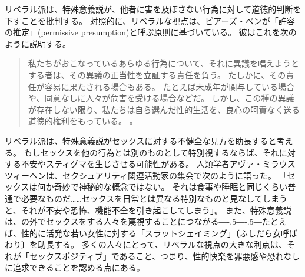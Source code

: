 \documentclass[paper=a4,book,openany]{jlreq}
\def\DDASH{―\kern-.5\zw―\kern-.5\zw―} %
\begin{document}
リベラル派は、特殊意義説が、他者に害を及ぼさない行為に対して道徳的判断を下すことを批判する。
対照的に、リベラルな視点は、ピアーズ・ベンが「許容の推定」(permissive presumption)と呼ぶ原則に基づいている。
彼はこれを次のように説明する。
\begin{quote}
  私たちがおこなっているあらゆる行為について、それに異議を唱えようとする者は、その異議の正当性を立証する責任を負う。
たしかに、その責任が容易に果たされる場合もある。
たとえば未成年が関与している場合や、同意なしに人々が危害を受ける場合などだ。
しかし、この種の異議が存在しない限り、私たちは自ら選んだ性的生活を、良心の呵責なく送る道徳的権利をもっている。
\citep[p. 237]{benn99:_is_sex_moral_special}。
\end{quote}
リベラル派は、特殊意義説がセックスに対する不健全な見方を助長すると考える。
もしセックスを他の行為とは別のものとして特別視するならば、それに対する不安やスティグマを生じさせる可能性がある。
人類学者アヴァ・ミラウスツィーヘンは、セクシュアリティ関連活動家の集会で次のように語った。
「セックスは何か奇妙で神秘的な概念ではない。
それは食事や睡眠と同じくらい普通で必要なものだ……セックスを日常とは異なる特別なものと見なしてしまうと、それが不安や恐怖、機能不全を引き起こしてしまう」\citep{fein13:_why_sex_is}。
また、特殊意義説は、の外でセックスをする人々を蔑視することにつながる{\DDASH}たとえば、性的に活発な若い女性に対する「スラットシェイミング」〔ふしだら女呼ばわり〕を助長する。
多くの人々にとって、リベラルな視点の大きな利点は、それが「セックスポジティブ」であること、つまり、性的快楽を罪悪感や恐れなしに追求できることを認める点にある。
\end{document}

